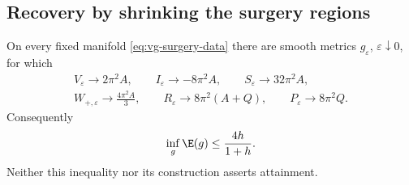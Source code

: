 \subsection{Recovery by shrinking the surgery regions}

\begin{proposition}\label{prop:vg-recovery}
On every fixed manifold \eqref{eq:vg-surgery-data} there are smooth metrics
$g_\varepsilon$, $\varepsilon\downarrow0$, for which
\begin{equation}\label{eq:vg-recovery-limits}
 \begin{gathered}
 V_\varepsilon\longrightarrow2\pi^2A,\qquad
 I_\varepsilon\longrightarrow-8\pi^2A,\qquad
 S_\varepsilon\longrightarrow32\pi^2A,\\
 W_{+,\varepsilon}\longrightarrow\frac{4\pi^2A}{3},\qquad
 R_\varepsilon\longrightarrow8\pi^2(A+Q),\qquad
 P_\varepsilon\longrightarrow8\pi^2Q.
 \end{gathered}
\end{equation}
Consequently
\begin{equation}\label{eq:vg-recovery-bound}
 \inf_g\E(g)\leq\frac{4h}{1+h}.
\end{equation}
Neither this inequality nor its construction asserts attainment.
\end{proposition}

